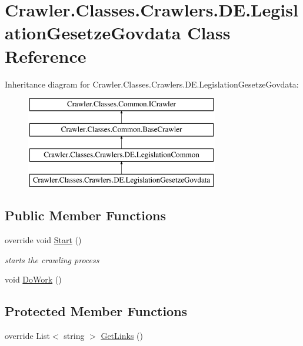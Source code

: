 \hypertarget{class_crawler_1_1_classes_1_1_crawlers_1_1_d_e_1_1_legislation_gesetze_govdata}{\section{Crawler.\-Classes.\-Crawlers.\-D\-E.\-Legislation\-Gesetze\-Govdata Class Reference}
\label{class_crawler_1_1_classes_1_1_crawlers_1_1_d_e_1_1_legislation_gesetze_govdata}
}
Inheritance diagram for Crawler.\-Classes.\-Crawlers.\-D\-E.\-Legislation\-Gesetze\-Govdata\-:\begin{figure}[H]
\begin{center}
\leavevmode
\includegraphics[height=4.000000cm]{class_crawler_1_1_classes_1_1_crawlers_1_1_d_e_1_1_legislation_gesetze_govdata}
\end{center}
\end{figure}
\subsection*{Public Member Functions}
\begin{DoxyCompactItemize}
\item 
override void \hyperlink{class_crawler_1_1_classes_1_1_crawlers_1_1_d_e_1_1_legislation_gesetze_govdata_a4b28d7fd1f22b7d070d21871d4337599}{Start} ()
\begin{DoxyCompactList}\small\item\em starts the crawling process \end{DoxyCompactList}\item 
void \hyperlink{class_crawler_1_1_classes_1_1_crawlers_1_1_d_e_1_1_legislation_gesetze_govdata_a55972f7a7e572bb68a5eb25c6ef41714}{Do\-Work} ()
\end{DoxyCompactItemize}
\subsection*{Protected Member Functions}
\begin{DoxyCompactItemize}
\item 
override List$<$ string $>$ \hyperlink{class_crawler_1_1_classes_1_1_crawlers_1_1_d_e_1_1_legislation_gesetze_govdata_ac7c50325edf0468e2467c2e65a0bcfb4}{Get\-Links} ()
\end{DoxyCompactItemize}
